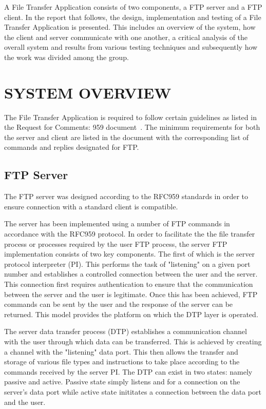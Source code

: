 \documentclass[10pt,twocolumn]{witseiepaper}
\begin{document}
A File Transfer Application consists of two components, a FTP server and a FTP client. In the report that follows, the design, implementation and testing of a File Transfer Application is presented. This includes an overview of the system, how the client and server communicate with one another, a critical analysis of the overall system and results from various testing techniques and subsequently how the work was divided among the group.


%
\section{SYSTEM OVERVIEW}
\label{sec: System Overview}
The File Transfer Application is required to follow certain guidelines as listed in the Request for Comments: 959 document~\cite{RFC959}. The minimum requirements for both the server and client are listed in the document with the corresponding list of commands and replies designated for FTP.

\subsection{FTP Server}
\label{sec: FTP Server}
The FTP server was designed according to the RFC959 standards in order to ensure connection with a standard client is compatible\cite{RFC959}.

The server has been implemented using a number of FTP commands in accordance with the RFC959 protocol. In order to facilitate the the file transfer process or processes required by the user FTP process, the server FTP implementation consists of two key components. The first of which is the server protocol interpreter (PI). This performs the task of "listening" on a given port number and establishes a controlled connection between the user and the server. This connection first requires authentication to ensure that the communication between the server and the user is legitimate. Once this has been achieved, FTP commands can be sent by the user and the response of the server can be returned. This model provides the platform on which the DTP layer is operated\cite{FTP}.

The server data transfer process (DTP) establishes a communication channel with the user through which data can be transferred. This is achieved by creating a channel with the "listening" data port. This then allows the transfer and storage of various file types and instructions to take place according to the commands received by the server PI. The DTP can exist in two states: namely passive and active. Passive state simply listens and for a connection on the server's data port while active state inititates a connection between the data port and the user.
\end{document}
